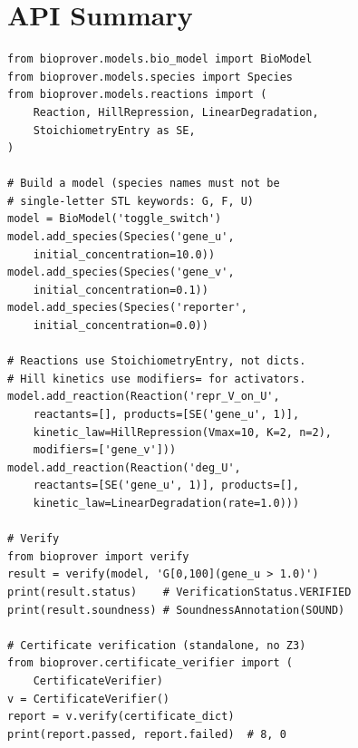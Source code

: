 \documentclass[11pt]{article}
\begin{document}
\section{API Summary}
\label{app:api}

\begin{lstlisting}[caption={Core API usage (correct syntax)},label=lst:api]
from bioprover.models.bio_model import BioModel
from bioprover.models.species import Species
from bioprover.models.reactions import (
    Reaction, HillRepression, LinearDegradation,
    StoichiometryEntry as SE,
)

# Build a model (species names must not be
# single-letter STL keywords: G, F, U)
model = BioModel('toggle_switch')
model.add_species(Species('gene_u',
    initial_concentration=10.0))
model.add_species(Species('gene_v',
    initial_concentration=0.1))
model.add_species(Species('reporter',
    initial_concentration=0.0))

# Reactions use StoichiometryEntry, not dicts.
# Hill kinetics use modifiers= for activators.
model.add_reaction(Reaction('repr_V_on_U',
    reactants=[], products=[SE('gene_u', 1)],
    kinetic_law=HillRepression(Vmax=10, K=2, n=2),
    modifiers=['gene_v']))
model.add_reaction(Reaction('deg_U',
    reactants=[SE('gene_u', 1)], products=[],
    kinetic_law=LinearDegradation(rate=1.0)))

# Verify
from bioprover import verify
result = verify(model, 'G[0,100](gene_u > 1.0)')
print(result.status)    # VerificationStatus.VERIFIED
print(result.soundness) # SoundnessAnnotation(SOUND)

# Certificate verification (standalone, no Z3)
from bioprover.certificate_verifier import (
    CertificateVerifier)
v = CertificateVerifier()
report = v.verify(certificate_dict)
print(report.passed, report.failed)  # 8, 0
\end{lstlisting}
\end{document}
